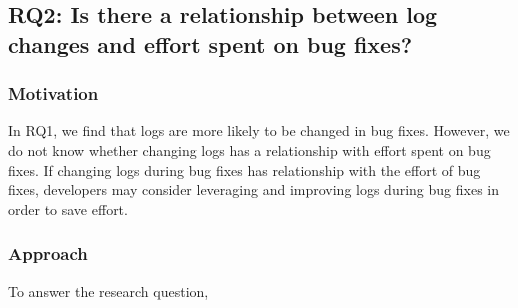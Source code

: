 \subsection*{RQ2: Is there a relationship between log changes and effort spent on bug fixes?}


\subsubsection*{Motivation}

In RQ1, we find that logs are more likely to be changed in bug fixes. However, we do not know whether changing logs has a relationship with effort spent on bug fixes. If changing logs during bug fixes has relationship with the effort of bug fixes, developers may consider leveraging and improving logs during bug fixes in order to save effort.

\subsubsection*{Approach}


To answer the research question, 

